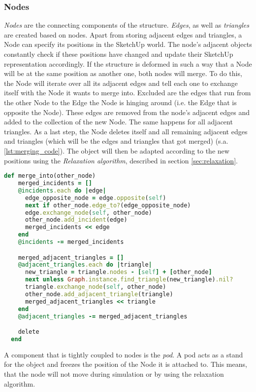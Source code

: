 \subsubsection{Nodes}
\textit{Nodes} are the connecting components of the structure. \textit{Edges}, as well as \textit{triangles} are created based on nodes. Apart from storing adjacent edges and triangles, a Node can specify its positions in the SketchUp world. The node's adjacent objects constantly check if these positions have changed and update their SketchUp representation accordingly. If the structure is deformed in such a way that a Node will be at the same position as another one, both nodes will merge. To do this, the Node will iterate over all its adjacent edges and tell each one to exchange itself with the Node it wants to merge into. Excluded are the edges that run from the other Node to the Edge the Node is hinging around (i.e. the Edge that is opposite the Node). These edges are removed from the node's adjacent edges and added to the collection of the new Node. The same happens for all adjacent triangles. As a last step, the Node deletes itself and all remaining adjacent edges and triangles (which will be the edges and triangles that got merged) (s.a. \ref{lst:merging_code}). The object will then be adapted according to the new positions using the \textit{Relaxation algorithm}, described in section \ref{sec:relaxation}.
\begin{lstlisting}[language=Ruby, label={lst:merging_code}, caption=Merging of two nodes]
  def merge_into(other_node)
    merged_incidents = []
    @incidents.each do |edge|
      edge_opposite_node = edge.opposite(self)
      next if other_node.edge_to?(edge_opposite_node)
      edge.exchange_node(self, other_node)
      other_node.add_incident(edge)
      merged_incidents << edge
    end
    @incidents -= merged_incidents

    merged_adjacent_triangles = []
    @adjacent_triangles.each do |triangle|
      new_triangle = triangle.nodes - [self] + [other_node]
      next unless Graph.instance.find_triangle(new_triangle).nil?
      triangle.exchange_node(self, other_node)
      other_node.add_adjacent_triangle(triangle)
      merged_adjacent_triangles << triangle
    end
    @adjacent_triangles -= merged_adjacent_triangles

    delete
  end
\end{lstlisting}
A component that is tightly coupled to nodes is the \textit{pod}. A pod acts as a stand for the object and freezes the position of the Node it is attached to. This means, that the node will not move during simulation or by using the relaxation algorithm.

